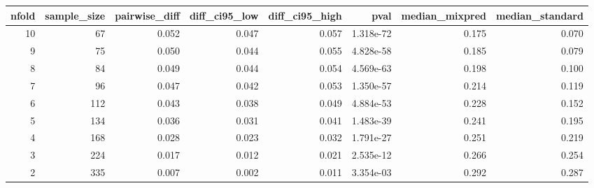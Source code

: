 \begin{table}[ht]
\centering
\begin{tabular}{rrrrrrrr}
  \hline
nfold & sample\_size & pairwise\_diff & diff\_ci95\_low & diff\_ci95\_high & pval & median\_mixpred & median\_standard \\ 
  \hline
  10 &   67 & 0.052 & 0.047 & 0.057 & 1.318e-72 & 0.175 & 0.070 \\ 
     9 &   75 & 0.050 & 0.044 & 0.055 & 4.828e-58 & 0.185 & 0.079 \\ 
     8 &   84 & 0.049 & 0.044 & 0.054 & 4.569e-63 & 0.198 & 0.100 \\ 
     7 &   96 & 0.047 & 0.042 & 0.053 & 1.350e-57 & 0.214 & 0.119 \\ 
     6 &  112 & 0.043 & 0.038 & 0.049 & 4.884e-53 & 0.228 & 0.152 \\ 
     5 &  134 & 0.036 & 0.031 & 0.041 & 1.483e-39 & 0.241 & 0.195 \\ 
     4 &  168 & 0.028 & 0.023 & 0.032 & 1.791e-27 & 0.251 & 0.219 \\ 
     3 &  224 & 0.017 & 0.012 & 0.021 & 2.535e-12 & 0.266 & 0.254 \\ 
     2 &  335 & 0.007 & 0.002 & 0.011 & 3.354e-03 & 0.292 & 0.287 \\ 
   \hline
\end{tabular}
\end{table}

